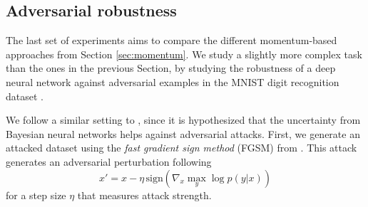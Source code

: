 \begin{table}[H]
\caption{Root Mean Squared Error results for the BNN experiments}\label{tab:bnn2}
\end{table}

\subsection{Adversarial robustness}

The last set of experiments aims to compare the different momentum-based approaches from Section \ref{sec:momentum}. We study a slightly more complex task than the ones in the previous Section, by studying the robustness of a deep neural network against adversarial examples \cite{goodfellow2014explaining} in the MNIST digit recognition dataset \cite{MNIST}.

We follow a similar setting to \cite{li2017dropout}, since it is hypothesized that the uncertainty from Bayesian neural networks helps against adversarial attacks. First, we generate an attacked dataset using the \emph{fast gradient sign method} (FGSM) from \cite{goodfellow2014explaining}. This attack generates an adversarial perturbation following
$$
x' = x - \eta\,\mbox{sign}(\nabla_x \max_y \log p(y|x))
$$
for a step size $\eta$ that measures attack strength.

